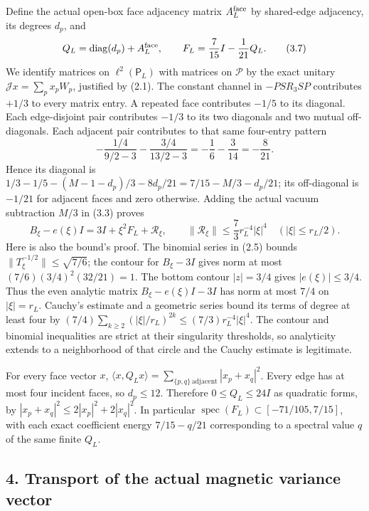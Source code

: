 \documentclass[
  11pt,
]{article}
\begin{document}
Define the actual open-box face adjacency matrix \(A_L^{\rm face}\) by
shared-edge adjacency, its degrees \(d_p\), and \[
 Q_L=\operatorname{diag}(d_p)+A_L^{\rm face},\qquad
 F_L=\frac7{15}I-\frac1{21}Q_L.
\tag{3.7}
\] We identify matrices on \(\ell^2(\mathsf P_L)\) with matrices on
\(\mathcal P\) by the exact unitary \(\mathcal Jx=\sum_px_pW_p\),
justified by (2.1). The constant channel in \(-PSR_3SP\) contributes
\(+1/3\) to every matrix entry. A repeated face contributes \(-1/5\) to
its diagonal. Each edge-disjoint pair contributes \(-1/3\) to its two
diagonals and two mutual off-diagonals. Each adjacent pair contributes
to that same four-entry pattern \[
 -\frac{1/4}{9/2-3}-\frac{3/4}{13/2-3}
 =-\frac16-\frac3{14}=-\frac8{21}.
\tag{3.8}
\] Hence its diagonal is \(1/3-1/5-(M-1-d_p)/3-8d_p/21
=7/15-M/3-d_p/21\); its off-diagonal is \(-1/21\) for adjacent faces and
zero otherwise. Adding the actual vacuum subtraction \(M/3\) in (3.3)
proves \[
 B_\xi-e(\xi)I=3I+\xi^2F_L+\mathcal R_\xi,
 \qquad \|\mathcal R_\xi\|\le\frac73 r_L^{-4}|\xi|^4
 \quad (|\xi|\le r_L/2).
\tag{3.9}
\] Here is also the bound's proof. The binomial series in (2.5) bounds
\(\|T_\xi^{-1/2}\|\le\sqrt{7/6}\); the contour for \(B_\xi-3I\) gives
norm at most \((7/6)(3/4)^2(32/21)=1\). The bottom contour \(|z|=3/4\)
gives \(|e(\xi)|\le3/4\). Thus the even analytic matrix
\(B_\xi-e(\xi)I-3I\) has norm at most \(7/4\) on \(|\xi|=r_L\). Cauchy's
estimate and a geometric series bound its terms of degree at least four
by \((7/4)\sum_{k\ge2}(|\xi|/r_L)^{2k}
\le(7/3)r_L^{-4}|\xi|^4\). The contour and binomial inequalities are
strict at their singularity thresholds, so analyticity extends to a
neighborhood of that circle and the Cauchy estimate is legitimate.

For every face vector \(x\),
\(\langle x,Q_Lx\rangle=\sum_{\{p,q\}\,\text{adjacent}}|x_p+x_q|^2\).
Every edge has at most four incident faces, so \(d_p\le12\). Therefore
\(0\le Q_L\le24I\) as quadratic forms, by
\(|x_p+x_q|^2\le2|x_p|^2+2|x_q|^2\). In particular
\(\operatorname{spec}(F_L)\subset[-71/105,7/15]\), with each exact
coefficient energy \(7/15-q/21\) corresponding to a spectral value \(q\)
of the same finite \(Q_L\).

\subsection{4. Transport of the actual magnetic variance
vector}\label{magnetic-part-9-transport-of-the-actual-magnetic-variance-vector}
\end{document}
